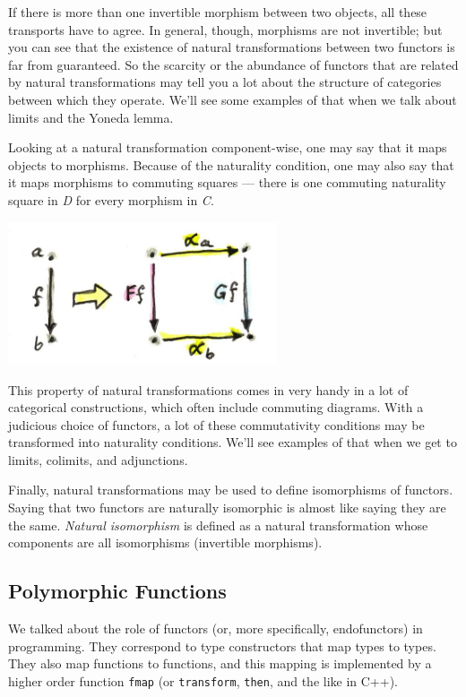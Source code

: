 If there is more than one invertible morphism between two objects, all
these transports have to agree. In general, though, morphisms are not
invertible; but you can see that the existence of natural
transformations between two functors is far from guaranteed. So the
scarcity or the abundance of functors that are related by natural
transformations may tell you a lot about the structure of categories
between which they operate. We'll see some examples of that when we talk
about limits and the Yoneda lemma.

Looking at a natural transformation component-wise, one may say that it
maps objects to morphisms. Because of the naturality condition, one may
also say that it maps morphisms to commuting squares --- there is one
commuting naturality square in \emph{D} for every morphism in \emph{C}.

\includegraphics[width=3.12500in]{images/naturality.jpg}

This property of natural transformations comes in very handy in a lot of
categorical constructions, which often include commuting diagrams. With
a judicious choice of functors, a lot of these commutativity conditions
may be transformed into naturality conditions. We'll see examples of
that when we get to limits, colimits, and adjunctions.

Finally, natural transformations may be used to define isomorphisms of
functors. Saying that two functors are naturally isomorphic is almost
like saying they are the same. \emph{Natural isomorphism} is defined as
a natural transformation whose components are all isomorphisms
(invertible morphisms).

\subsection{Polymorphic Functions}\label{polymorphic-functions}

We talked about the role of functors (or, more specifically,
endofunctors) in programming. They correspond to type constructors that
map types to types. They also map functions to functions, and this
mapping is implemented by a higher order function \texttt{fmap} (or
\texttt{transform}, \texttt{then}, and the like in C++).

